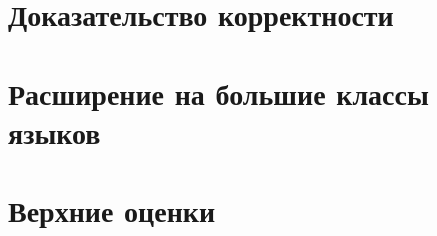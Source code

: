 \documentclass[14pt, a4paper, russian]{report}
\begin{document}
        \section{Доказательство корректности}
        \section{Расширение на большие классы языков}
        \section{Верхние оценки}
\newpage

\end{document}
